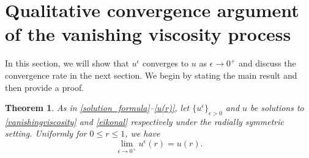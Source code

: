 \documentclass[12pt,reqno]{amsart}
\numberwithin{figure}{section}
\theoremstyle{plain}
\newtheorem{thm}[defn]{Theorem}
\numberwithin{equation}{section}
\begin{document}
\section{Qualitative convergence argument of the vanishing viscosity process}
In this section, we will show that $u^{\epsilon}$ converges to $u$ as $\epsilon \rightarrow 0^{+}$ and discuss the convergence rate in the next section. We begin by stating the main result and then provide a proof.
\begin{thm}\label{thm:convergence}
As in \eqref{solution_formula}--\eqref{u(r)}, let $\{u^\epsilon\}_{\epsilon>0}$ and $u$ be solutions to \eqref{vanishingviscosity} and \eqref{eikonal} respectively under the radially symmetric setting. Uniformly for  $0\le r\le1$, we have
\[
\lim_{\epsilon \to 0^+} u^\epsilon(r) = u(r).
\]
\end{thm}
\end{document}
